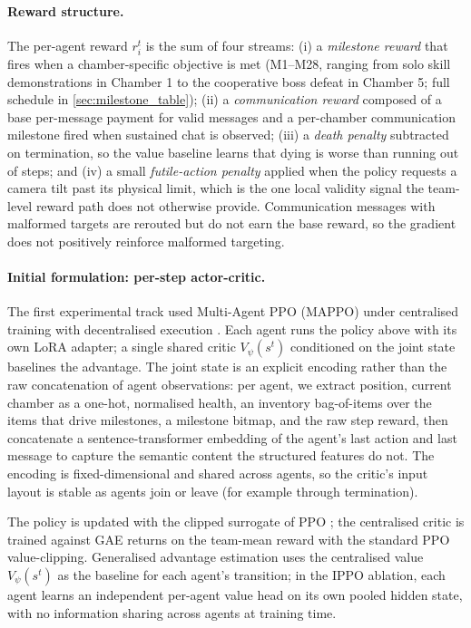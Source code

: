 \documentclass{article}
\theoremstyle{plain}
\theoremstyle{definition}
\theoremstyle{remark}
\begin{document}
\paragraph{Reward structure.}
The per-agent reward $r_i^t$ is the sum of four streams: (i) a \emph{milestone reward} that fires when a chamber-specific objective is met (M1--M28, ranging from solo skill demonstrations in Chamber 1 to the cooperative boss defeat in Chamber 5; full schedule in \autoref{sec:milestone_table}); (ii) a \emph{communication reward} composed of a base per-message payment for valid messages and a per-chamber communication milestone fired when sustained chat is observed; (iii) a \emph{death penalty} subtracted on termination, so the value baseline learns that dying is worse than running out of steps; and (iv) a small \emph{futile-action penalty} applied when the policy requests a camera tilt past its physical limit, which is the one local validity signal the team-level reward path does not otherwise provide. Communication messages with malformed targets are rerouted but do not earn the base reward, so the gradient does not positively reinforce malformed targeting.

\paragraph{Initial formulation: per-step actor-critic.}
The first experimental track used Multi-Agent PPO (MAPPO) \cite{yu2022surprising} under centralised training with decentralised execution \cite{amato2015scalable}. Each agent runs the policy above with its own LoRA adapter; a single shared critic $V_\psi(s^t)$ conditioned on the joint state baselines the advantage. The joint state is an explicit encoding rather than the raw concatenation of agent observations: per agent, we extract position, current chamber as a one-hot, normalised health, an inventory bag-of-items over the items that drive milestones, a milestone bitmap, and the raw step reward, then concatenate a sentence-transformer embedding of the agent's last action and last message to capture the semantic content the structured features do not. The encoding is fixed-dimensional and shared across agents, so the critic's input layout is stable as agents join or leave (for example through termination).

The policy is updated with the clipped surrogate of PPO \cite{yu2022surprising}; the centralised critic is trained against GAE \cite{} returns on the team-mean reward with the standard PPO value-clipping. Generalised advantage estimation uses the centralised value $V_\psi(s^t)$ as the baseline for each agent's transition; in the IPPO ablation, each agent learns an independent per-agent value head on its own pooled hidden state, with no information sharing across agents at training time.
\end{document}
